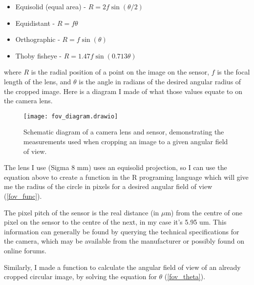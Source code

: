\documentclass{article}
\newcommand\file[1]{\texttt{\underline{#1}}}
\begin{document}
\begin{itemize}
	\item{Equisolid (equal area) - $R = 2f\sin{(\theta/2)}$}
	\item{Equidistant - $R = f\theta$}
	\item{Orthographic - $R = f\sin{(\theta)}$}
	\item{Thoby fisheye - $R = 1.47f\sin{(0.713\theta)}$}
\end{itemize}

where $R$ is the radial position of a point on the image on the sensor, $f$ is the focal length of the lens, and $\theta$ is the angle in radians of the desired angular radius of the cropped image. Here is a diagram I made of what those values equate to on the camera lens.

\begin{figure}[H]
\centering
	\texttt{[image: fov\_diagram.drawio]}
	\caption{Schematic diagram of a camera lens and sensor, demonstrating the measurements used when cropping an image to a given angular field of view.}
	\label{fov_diagram}
\end{figure}

The lens I use (Sigma 8 mm) uses an equisolid projection, so I can use the equation above to create a function in the R programing language which will give me the radius of the circle in pixels for a desired angular field of view (\autoref{fov_func}).

\begin{minipage}{\linewidth}

\end{minipage}

The pixel pitch of the sensor is the real distance (in $\mu$m) from the centre of one pixel on the sensor to the centre of the next, in my case it's 5.95 um. This information can generally be found by querying the technical specifications for the camera, which may be available from the manufacturer or possibly found on online forums.

Similarly, I made a function to calculate the angular field of view of an already cropped circular image, by solving the equation for $\theta$ (\autoref{fov_theta}). 

\begin{minipage}{\linewidth}

\end{minipage}
\end{document}
